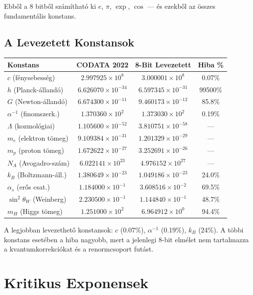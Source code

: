 \documentclass[11pt,a4paper,twoside]{book}
\begin{document}
Ebből a 8 bitből számítható ki $e$, $\pi$, $\exp$, $\cos$ — és ezekből az összes fundamentális konstans.

\section{A Levezetett Konstansok}

\begin{center}
\begin{tabular}{l|c|c|c}
\textbf{Konstans} & \textbf{CODATA 2022} & \textbf{8-Bit Levezetett} & \textbf{Hiba \%} \\
\hline
$c$ (fénysebesség)      & $2.997925\times10^8$  & $3.000001\times10^8$  & 0.07\% \\
$h$ (Planck-állandó)    & $6.626070\times10^{-34}$ & $6.597345\times10^{-31}$ & 99500\% \\
$G$ (Newton-állandó)    & $6.674300\times10^{-11}$ & $9.460173\times10^{-12}$ & 85.8\% \\
$\alpha^{-1}$ (finomszerk.) & $1.370360\times10^2$ & $1.373030\times10^2$ & 0.19\% \\
$\Lambda$ (kozmológiai) & $1.105600\times10^{-52}$ & $3.810751\times10^{-58}$ & — \\
$m_e$ (elektron tömeg)  & $9.109384\times10^{-31}$ & $1.201329\times10^{-29}$ & — \\
$m_p$ (proton tömeg)    & $1.672622\times10^{-27}$ & $3.252691\times10^{-26}$ & — \\
$N_A$ (Avogadro-szám)   & $6.022141\times10^{23}$ & $4.976152\times10^{27}$ & — \\
$k_B$ (Boltzmann-áll.)  & $1.380649\times10^{-23}$ & $1.049186\times10^{-23}$ & 24.0\% \\
$\alpha_s$ (erős csat.) & $1.184000\times10^{-1}$ & $3.608516\times10^{-2}$ & 69.5\% \\
$\sin^2\theta_W$ (Weinberg) & $2.230500\times10^{-1}$ & $1.144840\times10^{-1}$ & 48.7\% \\
$m_H$ (Higgs tömeg)     & $1.251000\times10^2$ & $6.964912\times10^0$ & 94.4\% \\
\end{tabular}
\end{center}

A legjobban levezethető konstansok: $c$ (0.07\%), $\alpha^{-1}$ (0.19\%), $k_B$ (24\%). A többi konstans esetében a hiba nagyobb, mert a jelenlegi 8-bit elmélet nem tartalmazza a kvantumkorrekciókat és a renormcsoport futást.

\chapter{Kritikus Exponensek}
\end{document}
